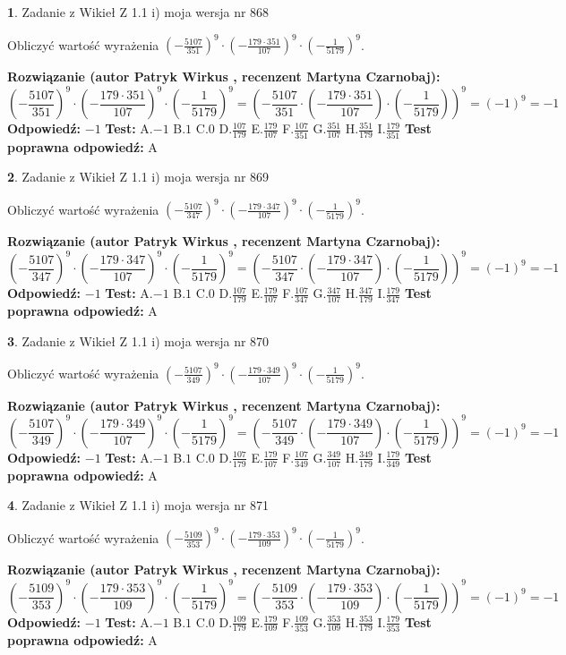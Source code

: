 \documentclass[12pt, a4paper]{article}
\theoremstyle{definition} %
\newtheorem{zad}{}
\newcommand{\zadStart}[1]{\begin{zad}#1\newline}
\newcommand{\zadStop}{\end{zad}}
\newcommand{\rozwStart}[2]{\noindent \textbf{Rozwiązanie (autor #1 , recenzent #2): }\newline}
\newcommand{\rozwStop}{\newline}
\newcommand{\odpStart}{\noindent \textbf{Odpowiedź:}\newline}
\newcommand{\odpStop}{\newline}
\newcommand{\testStart}{\noindent \textbf{Test:}\newline}
\newcommand{\testStop}{\newline}
\newcommand{\kluczStart}{\noindent \textbf{Test poprawna odpowiedź:}\newline}
\newcommand{\kluczStop}{\newline}
\begin{document}
\zadStart{Zadanie z Wikieł Z 1.1 i) moja wersja nr 868}

Obliczyć wartość wyrażenia $(-\frac{5107}{351})^{9} \cdot (-\frac{179 \cdot 351}{107})^{9} \cdot (-\frac{1}{5179})^{9}$.
\zadStop
\rozwStart{Patryk Wirkus}{Martyna Czarnobaj}
$$(-\frac{5107}{351})^{9} \cdot (-\frac{179 \cdot 351}{107})^{9} \cdot (-\frac{1}{5179})^{9} = (-\frac{5107}{351} \cdot (-\frac{179 \cdot 351}{107}) \cdot (-\frac{1}{5179}))^{9} = (-1)^{9} = -1$$
\rozwStop
\odpStart
$-1$
\odpStop
\testStart
A.$-1$ B.$1$ C.$0$ D.$\frac{107}{179}$ E.$\frac{179}{107}$
F.$\frac{107}{351}$ G.$\frac{351}{107}$
H.$\frac{351}{179}$
I.$\frac{179}{351}$
\testStop
\kluczStart
A
\kluczStop



\zadStart{Zadanie z Wikieł Z 1.1 i) moja wersja nr 869}

Obliczyć wartość wyrażenia $(-\frac{5107}{347})^{9} \cdot (-\frac{179 \cdot 347}{107})^{9} \cdot (-\frac{1}{5179})^{9}$.
\zadStop
\rozwStart{Patryk Wirkus}{Martyna Czarnobaj}
$$(-\frac{5107}{347})^{9} \cdot (-\frac{179 \cdot 347}{107})^{9} \cdot (-\frac{1}{5179})^{9} = (-\frac{5107}{347} \cdot (-\frac{179 \cdot 347}{107}) \cdot (-\frac{1}{5179}))^{9} = (-1)^{9} = -1$$
\rozwStop
\odpStart
$-1$
\odpStop
\testStart
A.$-1$ B.$1$ C.$0$ D.$\frac{107}{179}$ E.$\frac{179}{107}$
F.$\frac{107}{347}$ G.$\frac{347}{107}$
H.$\frac{347}{179}$
I.$\frac{179}{347}$
\testStop
\kluczStart
A
\kluczStop



\zadStart{Zadanie z Wikieł Z 1.1 i) moja wersja nr 870}

Obliczyć wartość wyrażenia $(-\frac{5107}{349})^{9} \cdot (-\frac{179 \cdot 349}{107})^{9} \cdot (-\frac{1}{5179})^{9}$.
\zadStop
\rozwStart{Patryk Wirkus}{Martyna Czarnobaj}
$$(-\frac{5107}{349})^{9} \cdot (-\frac{179 \cdot 349}{107})^{9} \cdot (-\frac{1}{5179})^{9} = (-\frac{5107}{349} \cdot (-\frac{179 \cdot 349}{107}) \cdot (-\frac{1}{5179}))^{9} = (-1)^{9} = -1$$
\rozwStop
\odpStart
$-1$
\odpStop
\testStart
A.$-1$ B.$1$ C.$0$ D.$\frac{107}{179}$ E.$\frac{179}{107}$
F.$\frac{107}{349}$ G.$\frac{349}{107}$
H.$\frac{349}{179}$
I.$\frac{179}{349}$
\testStop
\kluczStart
A
\kluczStop



\zadStart{Zadanie z Wikieł Z 1.1 i) moja wersja nr 871}

Obliczyć wartość wyrażenia $(-\frac{5109}{353})^{9} \cdot (-\frac{179 \cdot 353}{109})^{9} \cdot (-\frac{1}{5179})^{9}$.
\zadStop
\rozwStart{Patryk Wirkus}{Martyna Czarnobaj}
$$(-\frac{5109}{353})^{9} \cdot (-\frac{179 \cdot 353}{109})^{9} \cdot (-\frac{1}{5179})^{9} = (-\frac{5109}{353} \cdot (-\frac{179 \cdot 353}{109}) \cdot (-\frac{1}{5179}))^{9} = (-1)^{9} = -1$$
\rozwStop
\odpStart
$-1$
\odpStop
\testStart
A.$-1$ B.$1$ C.$0$ D.$\frac{109}{179}$ E.$\frac{179}{109}$
F.$\frac{109}{353}$ G.$\frac{353}{109}$
H.$\frac{353}{179}$
I.$\frac{179}{353}$
\testStop
\kluczStart
A
\kluczStop
\end{document}
